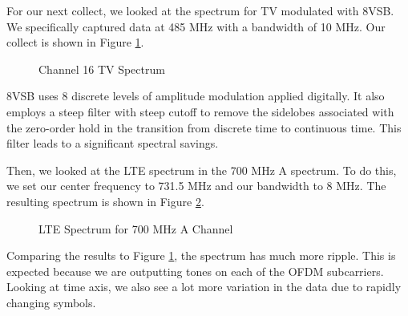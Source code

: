 \documentclass{article}
\begin{document}
For our next collect, we looked at the spectrum for TV modulated with 8VSB. We specifically captured data at 485 MHz with a bandwidth of 10 MHz. Our collect is shown in Figure \ref{fig::8vsb_spectrum}.

\begin{figure}[H]
	\centerline{}
	\caption{Channel 16 TV Spectrum}
	\label{fig::8vsb_spectrum}
\end{figure}

8VSB uses 8 discrete levels of amplitude modulation applied digitally. It also employs a steep filter with steep cutoff to remove the sidelobes associated with the zero-order hold in the transition from discrete time to continuous time. This filter leads to a significant spectral savings.
 
Then, we looked at the LTE spectrum in the 700 MHz A spectrum. To do this, we set our center frequency to 731.5 MHz and our bandwidth to 8 MHz. The resulting spectrum is shown in Figure \ref{fig::lte_spectrum}.

\begin{figure}[H]
	\centerline{}
	\caption{LTE Spectrum for 700 MHz A Channel}
	\label{fig::lte_spectrum}
\end{figure}

Comparing the results to Figure \ref{fig::8vsb_spectrum}, the spectrum has much more ripple. This is expected because we are outputting tones on each of the OFDM subcarriers. Looking at time axis, we also see a lot more variation in the data due to rapidly changing symbols.
\end{document}
